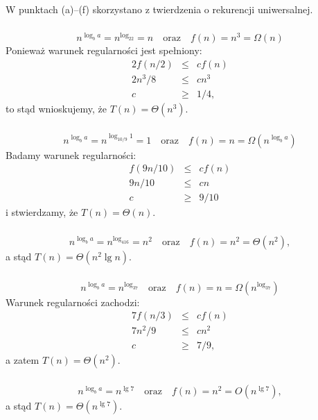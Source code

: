 \subsection{} %
W punktach (a)--(f) skorzystano z twierdzenia o rekurencji uniwersalnej.

\subsubsection{} %
\[
	n^{\log_ba}=n^{\log_22}=n\quad\mbox{oraz}\quad f(n)=n^3=\Omega(n)
\]
Ponieważ warunek regularności jest spełniony:
\begin{eqnarray*}
	2f(n/2) &\le& cf(n) \\
	2n^3/8 &\le& cn^3 \\
	c &\ge& 1/4,
\end{eqnarray*}
to stąd wnioskujemy, że $T(n)=\Theta(n^3)$.

\subsubsection{} %
\[
	n^{\log_ba}=n^{\log_{10/9}1}=1\quad\mbox{oraz}\quad f(n)=n=\Omega\left(n^{\log_ba}\right)
\]
Badamy warunek regularności:
\begin{eqnarray*}
	f(9n/10) &\le& cf(n) \\
	9n/10 &\le& cn \\
	c &\ge& 9/10
\end{eqnarray*}
i stwierdzamy, że $T(n)=\Theta(n)$.

\subsubsection{} %
\[
	n^{\log_ba}=n^{\log_416}=n^2\quad\mbox{oraz}\quad f(n)=n^2=\Theta(n^2),
\]
a stąd $T(n)=\Theta(n^2\lg n)$.

\subsubsection{} %
\[
	n^{\log_ba}=n^{\log_37}\quad\mbox{oraz}\quad f(n)=n=\Omega\left(n^{\log_37}\right)
\]
Warunek regularności zachodzi:
\begin{eqnarray*}
	7f(n/3) &\le& cf(n) \\
	7n^2/9 &\le& cn^2 \\
	c &\ge& 7/9,
\end{eqnarray*}
a zatem $T(n)=\Theta(n^2)$.

\subsubsection{} %
\[
	n^{\log_ba}=n^{\lg 7}\quad\mbox{oraz}\quad f(n)=n^2=O(n^{\lg 7}),
\]
a stąd $T(n)=\Theta(n^{\lg 7})$.

